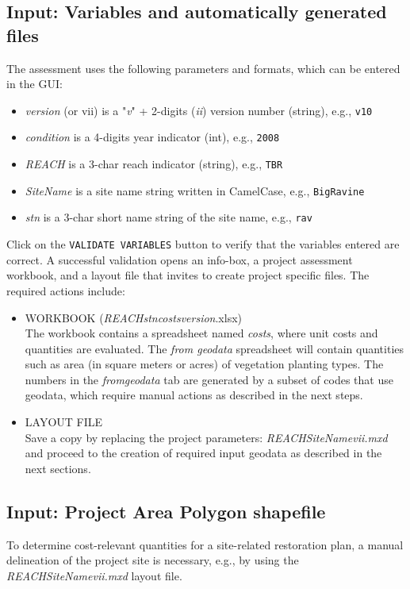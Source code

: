 \subsection{Input: Variables and automatically generated files}
The assessment uses the following parameters and formats, which can be entered in the GUI:
\begin{itemize}
  \item \textit{version} (or vii) is a "\textit{v}" + 2-digits (\textit{ii}) version number (string), e.g., \texttt{v10}
  \item \textit{condition} is a 4-digits year indicator (int), e.g., \texttt{2008}
  \item \textit{REACH} is a 3-char reach indicator (string), e.g., \texttt{TBR}
  \item \textit{SiteName} is a site name string written in CamelCase, e.g., \texttt{BigRavine}
  \item \textit{stn} is a 3-char short name string of the site name, e.g., \texttt{rav}
\end{itemize}

Click on the \texttt{VALIDATE VARIABLES} button to verify that the variables entered are correct. A successful validation opens an info-box, a project assessment workbook, and a layout file that invites to create project specific files. The required actions include:

\begin{itemize}
\item WORKBOOK (\emph{REACH}{\myUnderscore}\emph{stn}{\myUnderscore}\emph{costs}{\myUnderscore}\emph{version}.xlsx)\\
	The workbook contains a spreadsheet named \emph{costs}, where unit costs and quantities are evaluated. The \emph{from{\myUnderscore} geodata} spreadsheet will contain quantities such as area (in square meters or acres) of vegetation planting types. The numbers in the \emph{from{\myUnderscore}geodata} tab are generated by a subset of codes that use geodata, which require manual actions as described in the next steps. 
\item LAYOUT FILE\\
  	Save a copy by replacing the project parameters: \emph{REACH}{\myUnderscore}\emph{SiteName}{\myUnderscore}\emph{vii.mxd} and proceed to the creation of required input geodata as described in the next sections.
\end{itemize}

\subsection{Input: Project Area Polygon shapefile} \label{sec:pminp2}
To determine cost-relevant quantities for a site-related restoration plan, a manual delineation of the project site is necessary, e.g., by using the \emph{REACH}{\myUnderscore}\emph{SiteName}{\myUnderscore}\emph{vii.mxd} layout file.

